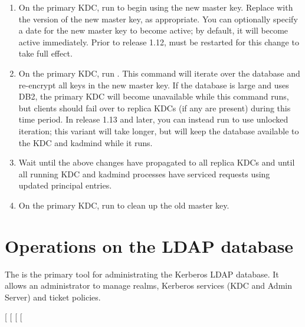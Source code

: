 \documentclass[letterpaper,10pt,english]{sphinxmanual}
\begin{document}
\begin{enumerate}
\item {} 
On the primary KDC, run  to begin using the
new master key.  Replace  with the version of the new master
key, as appropriate.  You can optionally specify a date for the new
master key to become active; by default, it will become active
immediately.  Prior to release 1.12, {\hyperref[\detokenize{admin/admin_commands/kadmind:kadmind-8}]{}} must be
restarted for this change to take full effect.

\item {} 
On the primary KDC, run .
This command will iterate over the database and re-encrypt all keys
in the new master key.  If the database is large and uses DB2, the
primary KDC will become unavailable while this command runs, but
clients should fail over to replica KDCs (if any are present)
during this time period.  In release 1.13 and later, you can
instead run  to
use unlocked iteration; this variant will take longer, but will
keep the database available to the KDC and kadmind while it runs.

\item {} 
Wait until the above changes have propagated to all replica KDCs
and until all running KDC and kadmind processes have serviced
requests using updated principal entries.

\item {} 
On the primary KDC, run  to clean up the
old master key.

\end{enumerate}


\section{Operations on the LDAP database}
\label{\detokenize{admin/database:operations-on-the-ldap-database}}\label{\detokenize{admin/database:ops-on-ldap}}
The {\hyperref[\detokenize{admin/admin_commands/kdb5_ldap_util:kdb5-ldap-util-8}]{}} is the primary tool for administrating
the Kerberos LDAP database.  It allows an administrator to manage
realms, Kerberos services (KDC and Admin Server) and ticket policies.

{[}  {[} \sphinxstyleemphasis{passwd}{]}{]}
{[} \sphinxstyleemphasis{ldapuri}{]}
{[}\sphinxstyleemphasis{command\_options}{]}
\end{document}
